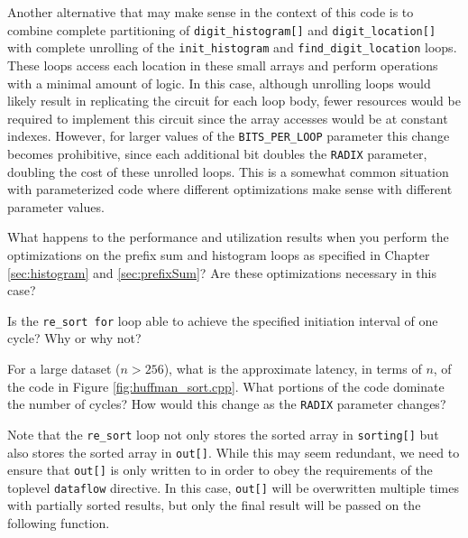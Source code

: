 Another alternative that may make sense in the context of this code is to combine complete partitioning of \lstinline{digit_histogram[]} and \lstinline{digit_location[]} with complete unrolling of the \lstinline{init_histogram} and \lstinline{find_digit_location} loops.   These loops access each location in these small arrays and perform operations with a minimal amount of logic.  In this case, although unrolling loops would likely result in replicating the circuit for each loop body, fewer resources would be required to implement this circuit since the array accesses would be at constant indexes.  However, for larger values of the \lstinline{BITS_PER_LOOP} parameter this change becomes prohibitive, since each additional bit doubles the \lstinline{RADIX} parameter, doubling the cost of these unrolled loops.  This is a somewhat common situation with parameterized code where different optimizations make sense with different parameter values.

\begin{exercise}
What happens to the performance and utilization results when you perform the optimizations on the prefix sum and histogram loops as specified in Chapter \ref{sec:histogram} and \ref{sec:prefixSum}?  Are these optimizations necessary in this case?
\end{exercise}

\begin{exercise}
Is the \lstinline{re_sort for} loop able to achieve the specified initiation interval of one cycle? Why or why not?
\end{exercise}

\begin{exercise}
For a large dataset ($n > 256$), what is the approximate latency, in terms of $n$, of the code in Figure \ref{fig:huffman_sort.cpp}.  What portions of the code dominate the number of cycles?  How would this change as the \lstinline{RADIX} parameter changes?
\end{exercise}

Note that the \lstinline{re_sort} loop not only stores the sorted array in \lstinline{sorting[]} but also stores the sorted array in \lstinline{out[]}.  While this may seem redundant, we need to ensure that \lstinline{out[]} is only written to in order to obey the requirements of the toplevel \lstinline{dataflow} directive.  In this case, \lstinline{out[]} will be overwritten multiple times with partially sorted results, but only the final result will be passed on the following function.

